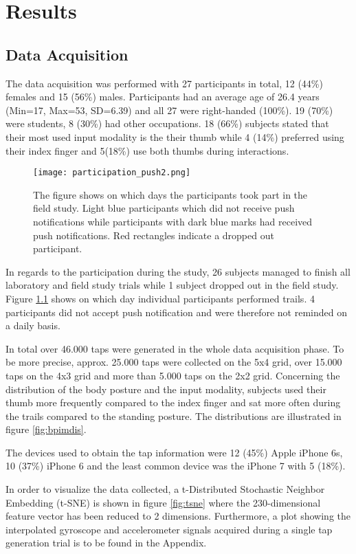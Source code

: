 \chapter{Results\label{cha:chapter6}}
\section{Data Acquisition}
The data acquisition was performed with 27 participants in total, 12 (44\%) females and 15 (56\%) males. Participants had an average age of 26.4 years (Min=17, Max=53, SD=6.39) and all 27 were right-handed (100\%). 19 (70\%) were students, 8 (30\%) had other occupations.
18 (66\%) subjects stated that their most used input modality is the their thumb while 4 (14\%) preferred using their index finger and 5(18\%) use both thumbs during interactions.\\

\begin{figure}[h!]
  \centering
  \texttt{[image: participation\_push2.png]}
  \caption{The figure shows on which days the participants took part in the field study. Light blue participants which did not receive push notifications while participants with dark blue marks had received push notifications. Red rectangles indicate a dropped out participant.} \label{fig:participation}
\end{figure}

In regards to the participation during the study, 26 subjects managed to finish all laboratory and field study trials while 1 subject dropped out in the field study. Figure \ref{fig:participation} shows on which day individual participants performed trails. 4 participants did not accept push notification and were therefore not reminded on a daily basis.

In total over 46.000 taps were generated in the whole data acquisition phase. To be more precise, approx. 25.000 taps were collected on the 5x4 grid, over 15.000 taps on the 4x3 grid and more than 5.000 taps on the 2x2 grid. Concerning the distribution of the body posture and the input modality, subjects used their thumb more frequently compared to the index finger and sat more often during the trails compared to the standing posture. The distributions are illustrated in figure \ref{fig:bpimdis}.

The devices used to obtain the tap information were 12 (45\%) Apple iPhone 6s, 10 (37\%) iPhone 6 and the least common device was the iPhone 7 with 5 (18\%).

In order to visualize the data collected, a t-Distributed Stochastic Neighbor Embedding (t-SNE) is shown in figure \ref{fig:tsne} where the 230-dimensional feature vector has been reduced to 2 dimensions. Furthermore, a plot showing the interpolated gyroscope and accelerometer signals acquired during a single tap generation trial is to be found in the Appendix.

